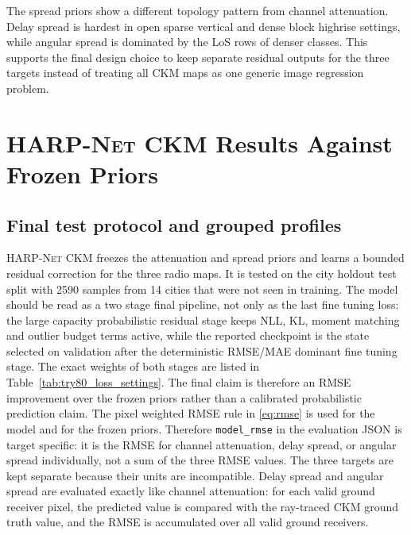 The spread priors show a different topology pattern from channel attenuation.
Delay spread is hardest in open sparse vertical and dense block highrise
settings, while angular spread is dominated by the LoS rows of denser classes.
This supports the final design choice to keep separate residual outputs for the
three targets instead of treating all CKM maps as one generic image regression
problem.

\section{\textsc{HARP-Net CKM} Results Against Frozen Priors}

\subsection{Final test protocol and grouped profiles}

\textsc{HARP-Net CKM} freezes the attenuation and spread priors and learns a bounded residual correction
for the three radio maps. It is tested on the city holdout test split with
2590 samples from 14 cities that were not seen in training. The model should
be read as a two stage final
pipeline, not only as the last fine tuning loss:
the large capacity probabilistic residual stage keeps NLL, KL, moment matching and
outlier budget terms active, while the reported checkpoint is the state
selected on validation after the deterministic RMSE/MAE dominant
fine tuning stage. The exact weights of both stages are listed in
Table~\ref{tab:try80_loss_settings}. The final claim is therefore an RMSE
improvement over the frozen priors rather than a calibrated probabilistic
prediction claim. The pixel weighted RMSE rule in \eqref{eq:rmse} is used for
the model and for the frozen priors.
Therefore \texttt{model\_rmse} in the evaluation JSON is target specific: it is the RMSE
for channel attenuation, delay spread, or angular spread individually, not a sum of the
three RMSE values. The three targets are kept separate because their units are
incompatible. Delay spread and angular spread are evaluated exactly like channel
attenuation: for each valid ground receiver pixel, the predicted value is
compared with the ray-traced CKM ground truth value, and the RMSE is accumulated
over all valid ground receivers.

